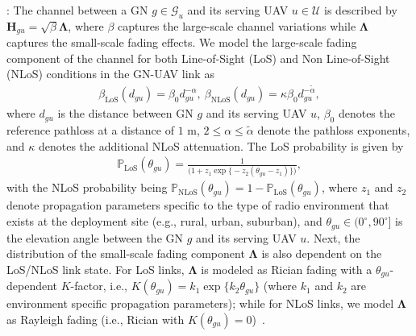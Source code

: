 \documentclass[10pt, twocolumn]{IEEEtran}
\renewcommand\theadalign{c}
\renewcommand{\tabcolsep}{12pt}
\renewcommand\theadfont{\bfseries}
\renewcommand\cellgape{\Gape[2pt]}
\renewcommand\theadgape{\Gape[2pt]}
\begin{document}
: The channel between a GN $g{\in}\mathcal{G}_{u}$ and its serving UAV $u{\in}\mathcal{U}$ is described by $\mathbf{H}_{gu}{=}\sqrt{\beta}\boldsymbol{\Lambda}$, where $\beta$ captures the large-scale channel variations while $\boldsymbol{\Lambda}$ captures the small-scale fading effects. We model the large-scale fading component of the channel for both Line-of-Sight (LoS) and Non Line-of-Sight (NLoS) conditions in the GN-UAV link as
\begin{align}\label{Large_scale}
    \beta_{\mathrm{LoS}}\left(d_{gu}\right) = \beta_{0}d_{gu}^{-\alpha},\ \beta_{\mathrm{NLoS}}\left(d_{gu}\right) = \kappa\beta_{0}d_{gu}^{-\tilde{\alpha}},
\end{align}
where $d_{gu}$ is the distance between GN $g$ and its serving UAV $u$, $\beta_{0}$ denotes the reference pathloss at a distance of $1$ m, $2{\leq}\alpha{\leq}\tilde{\alpha}$ denote the pathloss exponents, and $\kappa$ denotes the additional NLoS attenuation. The LoS probability is given by
\vspace{-2.1mm}
\begin{align}\label{probabilistic}
    \mathbb{P}_{\mathrm{LoS}}\left(\theta_{gu}\right) = \frac{1}{\Big(1 + z_{1}\exp\big\{{-}z_{2}(\theta_{gu} - z_{1})\big\}\Big)},
\end{align}
with the NLoS probability being $\mathbb{P}_{\mathrm{NLoS}}\left(\theta_{gu}\right){=}1{-}\mathbb{P}_{\mathrm{LoS}}\left(\theta_{gu}\right)$, where $z_{1}$ and $z_{2}$ denote propagation parameters specific to the type of radio environment that exists at the deployment site (e.g., rural, urban, suburban), and $\theta_{gu}{\in}(0^{\circ},90^{\circ}]$ is the elevation angle between the GN $g$ and its serving UAV $u$. Next, the distribution of the small-scale fading component $\boldsymbol{\Lambda}$ is also dependent on the LoS/NLoS link state. For LoS links, $\boldsymbol{\Lambda}$ is modeled as Rician fading with a $\theta_{gu}$-dependent $K$-factor, i.e., $K\left(\theta_{gu}\right){=}k_{1}\exp\{k_{2}\theta_{gu}\}$ (where $k_{1}$ and $k_{2}$ are environment specific propagation parameters); while for NLoS links, we model $\boldsymbol{\Lambda}$ as Rayleigh fading (i.e., Rician with $K\left(\theta_{gu}\right){=}0$)~\cite{MAESTRO_TCCN}.
\renewcommand\theadalign{c}
\renewcommand{\tabcolsep}{1.5pt}
\renewcommand\theadfont{\bfseries}
\renewcommand\cellgape{\Gape[1pt]}
\renewcommand\theadgape{\Gape[1pt]}
\end{document}
